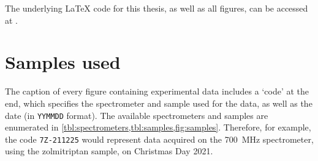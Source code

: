The underlying \LaTeX{} code for this thesis, as well as all figures, can be accessed at .

\section*{Samples used}

The caption of every figure containing experimental data includes a `code' at the end, which specifies the spectrometer and sample used for the data, as well as the date (in \texttt{YYMMDD} format).
The available spectrometers and samples are enumerated in \cref{tbl:spectrometers,tbl:samples,fig:samples}.
Therefore, for example, the code \texttt{7Z-211225} would represent data acquired on the \qty{700}{\MHz} spectrometer, using the zolmitriptan sample, on Christmas Day 2021.

